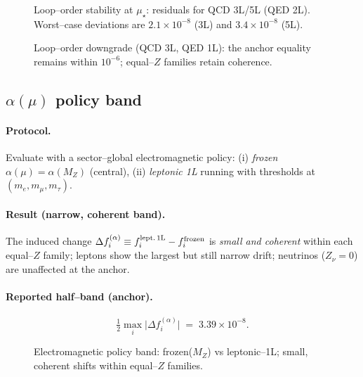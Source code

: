 \documentclass[epjc3]{svjour3}
\begin{document}
\begin{figure}[t]
  \centering
  \caption{Loop–order stability at $\mu_\star$: residuals for QCD 3L/5L (QED 2L). Worst–case deviations are $2.1\times10^{-8}$ (3L) and $3.4\times10^{-8}$ (5L).}
\end{figure}

\begin{figure}[t]
  \centering
  \caption{Loop–order downgrade (QCD 3L, QED 1L): the anchor equality remains within $10^{-6}$; equal–$Z$ families retain coherence.}
\end{figure}

\subsection{$\alpha(\mu)$ policy band}\label{sec:robust-alpha}

\paragraph{Protocol.} Evaluate with a sector–global electromagnetic policy: (i) \emph{frozen} $\alpha(\mu)\!=\!\alpha(M_Z)$ (central), (ii) \emph{leptonic 1L} running with thresholds at $(m_e,m_\mu,m_\tau)$.

\paragraph{Result (narrow, coherent band).} The induced change
\(
\Delta f_i^{(\alpha)} \equiv f_i^{\rm lept.\,1L}-f_i^{\rm frozen}
\)
is \emph{small and coherent} within each equal–$Z$ family; leptons show the largest but still narrow drift; neutrinos ($Z_\nu=0$) are unaffected at the anchor.%

\paragraph{Reported half–band (anchor).}
\[
\tfrac12\max_i\bigl|\Delta f_i^{(\alpha)}\bigr|\;=\;3.39\times10^{-8}.
\]

\begin{figure}[t]
  \centering
  \caption{Electromagnetic policy band: frozen($M_Z$) vs leptonic–1L; small, coherent shifts within equal–$Z$ families.}
\end{figure}
\end{document}
